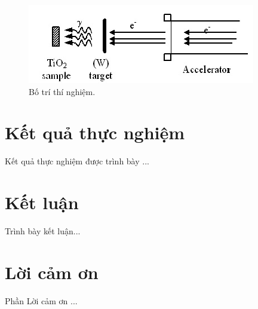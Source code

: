 \documentclass[11pt, a4paper, journal]{paper}
\begin{document}
\begin{figure}[!htb]
\centering
	\includegraphics[width=0.7\linewidth]{exp.png}
	\caption{Bố trí thí nghiệm.}
	\label{fig:exp}
\end{figure}




\section{Kết quả thực nghiệm}
Kết quả thực nghiệm được trình bày ...



\section{Kết luận}
Trình bày kết luận...



\section{Lời cảm ơn}
Phần Lời cảm ơn ...






\end{document}
